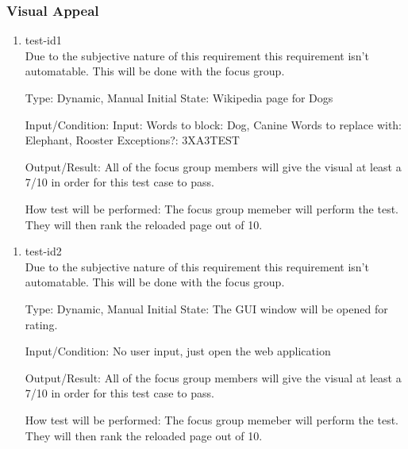 \documentclass[12pt, titlepage]{article}
\begin{document}
\subsubsection{Visual Appeal}
\begin{enumerate}
\item{test-id1\\}
Due to the subjective nature of this requirement this requirement isn't automatable. This will be done with the focus group.

Type: Dynamic, Manual
Initial State: Wikipedia page for Dogs
					
Input/Condition: Input: Words to block: Dog, Canine
Words to replace with: Elephant, Rooster
Exceptions?: 3XA3TEST
					
Output/Result: All of the focus group members will give the visual at least a 7/10 in order for this test case to pass.
					
How test will be performed: The focus group memeber will perform the test. They will then rank the reloaded page out of 10.
\end{enumerate}
\begin{enumerate}
\item{test-id2\\}
Due to the subjective nature of this requirement this requirement isn't automatable. This will be done with the focus group.

Type: Dynamic, Manual
Initial State: The GUI window will be opened for rating.
					
Input/Condition: No user input, just open the web application
					
Output/Result: All of the focus group members will give the visual at least a 7/10 in order for this test case to pass.
					
How test will be performed: The focus group memeber will perform the test. They will then rank the reloaded page out of 10.
\end{enumerate}
\end{document}
